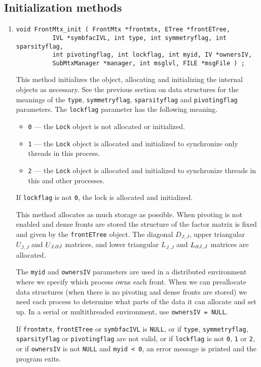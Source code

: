 \subsection{Initialization methods}
\label{subsection:FrontMtx:proto:initialization}
\par
\begin{enumerate}
\item
\begin{verbatim}
void FrontMtx_init ( FrontMtx *frontmtx, ETree *frontETree, 
          IVL *symbfacIVL, int type, int symmetryflag, int sparsityflag,
          int pivotingflag, int lockflag, int myid, IV *ownersIV, 
          SubMtxManager *manager, int msglvl, FILE *msgFile ) ;
\end{verbatim}
This method initializes the object, allocating and initializing the 
internal objects as necessary.
See the previous section on data structures for the meanings of the
{\tt type}, {\tt symmetryflag}, {\tt sparsityflag} and 
{\tt pivotingflag} parameters.
The {\tt lockflag} parameter has the following meaning.
\begin{itemize}
\item {\tt 0} --- the {\tt Lock} object is not allocated 
                  or initialized.
\item {\tt 1} --- the {\tt Lock} object is allocated and initialized 
                  to synchronize only threads in this process.
\item {\tt 2} --- the {\tt Lock} object is allocated and initialized 
                  to synchronize threads in this and other processes.
\end{itemize}
If {\tt lockflag} is not {\tt 0}, the lock is allocated and
initialized.
\par
This method allocates as much storage as possible.
When pivoting is not enabled and dense fronts are stored 
the structure of the factor matrix is fixed and given by the 
{\tt frontETree} object.
The diagonal $D_{J,J}$, 
upper triangular $U_{J,J}$ and $U_{J,{\partial{J}}}$ matrices,
and lower triangular $L_{J,J}$ and $L_{{\partial{J}},J}$ matrices
are allocated.
\par
The {\tt myid} and {\tt ownersIV} parameters are used in
a distributed environment where we specify which process
owns each front. When we can preallocate data structures
(when there is no pivoting and dense fronts are stored) we
need each process to determine what parts of the data it
can allocate and set up. In a serial or multithreaded 
environment, use {\tt ownersIV = NULL}.
\par {}
If {\tt frontmtx}, {\tt frontETree} or {\tt symbfacIVL} is {\tt NULL},
or if {\tt type}, {\tt symmetryflag}, {\tt sparsityflag} 
or {\tt pivotingflag} are not valid,
or if {\tt lockflag} is not {\tt 0}, {\tt 1} or {\tt 2},
or if {\tt ownersIV} is not {\tt NULL} and {\tt myid < 0},
an error message is printed and the program exits.
\end{enumerate}
\par
